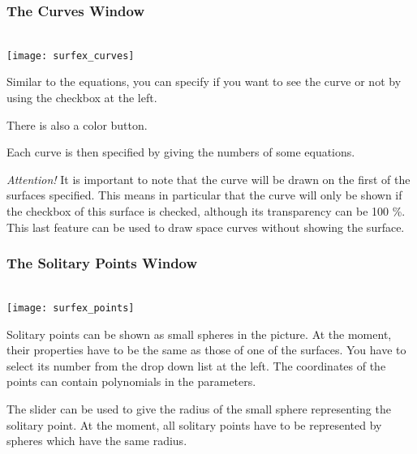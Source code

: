 \documentclass{article}
\newcommand{\attention}{\emph{Attention!}}
\begin{document}
\subsubsection{The Curves Window}

\ \\\texttt{[image: surfex\_curves]}

Similar to the equations, you can specify if you want to see the curve or not
by using the checkbox at the left.

There is also a color button.

Each curve is then specified by giving the numbers of some equations.

\attention{}
It is important to note that the curve will be drawn on the first of the
surfaces specified.
This means in particular that the curve will only be shown if the checkbox of
this surface is checked, although its transparency can be 100 \%.
This last feature can be used to draw space curves without showing the
surface.


\subsubsection{The Solitary Points Window}

\ \\\texttt{[image: surfex\_points]}

Solitary points can be shown as small spheres in the picture.
At the moment, their properties have to be the same as those of one of the
surfaces.
You have to select its number from the drop down list at the left.
The coordinates of the points can contain polynomials in the parameters.

The slider can be used to give the radius of the small sphere representing the
solitary point.
At the moment, all solitary points have to be represented by spheres which
have the same radius.
\end{document}
